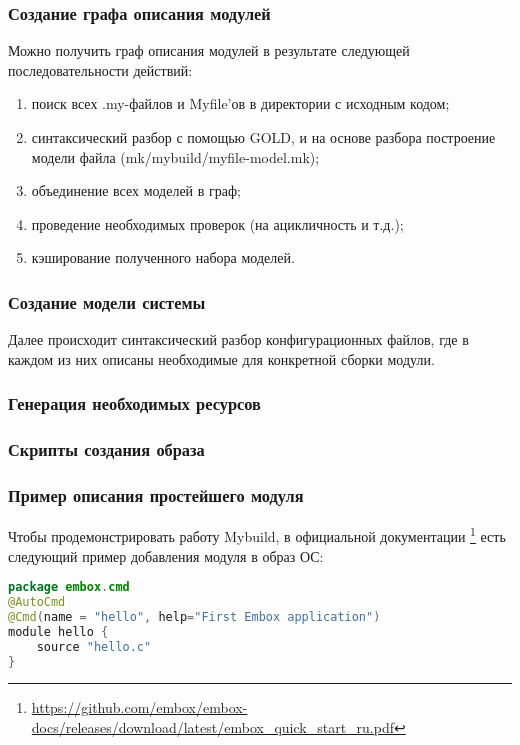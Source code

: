 \subsubsection{Создание графа описания модулей}
Можно получить граф описания модулей в результате следующей последовательности действий:
\begin{enumerate}
	\item поиск всех .my-файлов и Myfile'ов в директории с исходным кодом;
	\item синтаксический разбор с помощью GOLD, и на основе разбора построение модели файла (mk/mybuild/myfile-model.mk);
	\item объединение всех моделей в граф;
	\item проведение необходимых проверок (на ацикличность и т.д.);
	\item кэширование полученного набора моделей.
\end{enumerate}

\subsubsection{Создание модели системы}
Далее происходит синтаксический разбор конфигурационных файлов, где в каждом из них описаны необходимые для конкретной сборки модули.
\subsubsection{Генерация необходимых ресурсов}
\subsubsection{Скрипты создания образа}
\subsubsection{Пример описания простейшего модуля}
Чтобы продемонстрировать работу Mybuild, в официальной документации
\footnote{\href{https://github.com/embox/embox-docs/releases/download/latest/embox\_quick\_start\_ru.pdf}
	{https://github.com/embox/embox-docs/releases/download/latest/embox\_quick\_start\_ru.pdf}} есть следующий пример добавления модуля в образ ОС:

\begin{lstlisting}[caption=Пример описания модуля, language=Java, frame=single, breaklines]
package embox.cmd
@AutoCmd
@Cmd(name = "hello", help="First Embox application")
module hello {
    source "hello.c"
}
\end{lstlisting}

